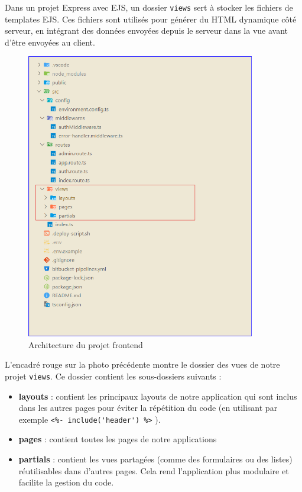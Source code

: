 \vspace{0.35cm} 
Dans un projet Express avec EJS, un dossier \verb|views| sert à stocker les fichiers de templates EJS. Ces fichiers sont utilisés pour générer du HTML dynamique côté serveur, en intégrant des données envoyées depuis le serveur dans la vue avant d'être envoyées au client.

\vspace{0.35cm}

\begin{figure}[H]
\begin{center}
\includegraphics[width=10cm]{assets/presentation/fixaars-front.png}
\end{center}
\caption{Architecture du projet frontend}
\end{figure}

L'encadré rouge sur la photo précédente montre le dossier des vues de notre projet \verb|views|. Ce dossier contient les sous-dossiers suivants : 

\begin{itemize}
    \item \textbf{layouts} : contient les principaux layouts de notre application qui sont inclus dans les autres pages pour éviter la répétition du code (en utilisant par exemple \verb|<%- include('header') %>| ).
    \item \textbf{pages} : contient toutes les pages de notre applications
    \item \textbf{partials} : contient les vues partagées (comme des formulaires ou des listes) réutilisables dans d'autres pages. Cela rend l'application plus modulaire et facilite la gestion du code.
\end{itemize}

